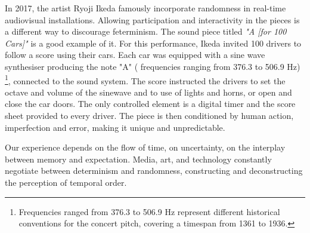 In 2017, the artist Ryoji Ikeda famously incorporate randomness in real-time audiovisual installations. Allowing participation and interactivity in the pieces is a different way to discourage feterminism. The sound piece titled \textit{"A [for 100 Cars]"} is a good example of it. For this performance, Ikeda invited 100 drivers to follow a score using their cars. Each car was equipped with a sine wave synthesiser producing the note "A" ( frequencies ranging from 376.3 to 506.9 Hz) \footnote{Frequencies ranged from 376.3 to 506.9 Hz represent different historical conventions for the concert pitch, covering a timespan from 1361 to 1936.}, connected to the sound system. The score instructed the drivers to set the octave and volume of the sinewave and to use of lights and horns, or open and close the car doors. The only controlled element is a digital timer and the score sheet provided to every driver. The piece is then conditioned by human action, imperfection and error, making it unique and unpredictable. 

Our experience depends on the flow of time, on uncertainty, on the interplay between memory and expectation. Media, art, and technology constantly negotiate between determinism and randomness, constructing and deconstructing the perception of temporal order.





